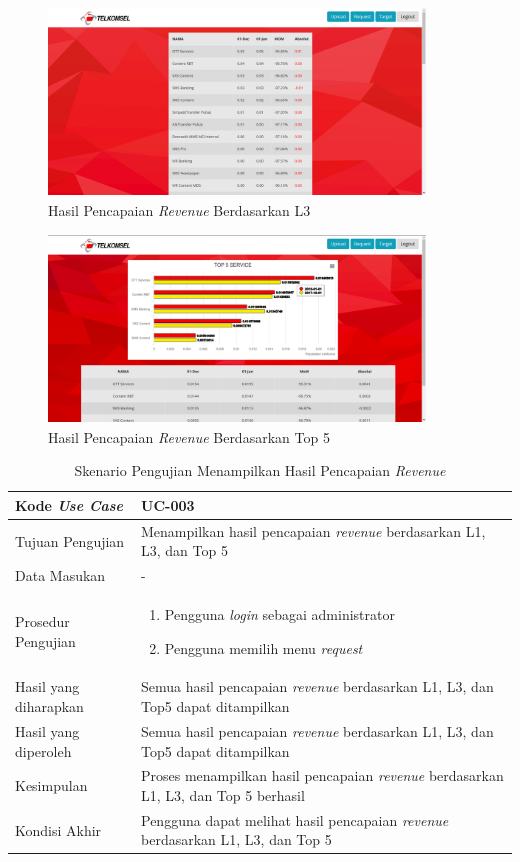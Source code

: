 \begin{figure}[h!]
	\centerline
	{\includegraphics[width=10cm,height=5cm]{bab6/halamanL3.png}}
	\caption{Hasil Pencapaian \textit{Revenue} Berdasarkan L3}
	\label{figure:requestL3}
\end{figure}

\begin{figure}[h!]
	\centerline
	{\includegraphics[width=10cm,height=5cm]{bab6/halamanT5.png}}
	\caption{Hasil Pencapaian \textit{Revenue} Berdasarkan Top 5}
	\label{figure:requestTop5}
\end{figure}

\begin{table}[h!]
	\centering
	\begin{tabular}{|p{4cm}|p{6cm}|}
		\hline
		Kode \textit{Use Case} & UC-003\\ \hline
		Tujuan Pengujian & Menampilkan hasil pencapaian \textit{revenue} berdasarkan L1, L3, dan Top 5\\ \hline
		Data Masukan & - \\ \hline
		Prosedur Pengujian & 
		\begin{enumerate}
			\item Pengguna \textit{login} sebagai administrator
			\item Pengguna memilih menu \textit{request}
		\end{enumerate}\\ \hline
		Hasil yang diharapkan & Semua hasil pencapaian \textit{revenue} berdasarkan L1, L3, dan Top5 dapat ditampilkan \\ \hline
		Hasil yang diperoleh & Semua hasil pencapaian \textit{revenue} berdasarkan L1, L3, dan Top5 dapat ditampilkan \\ \hline
		Kesimpulan & Proses menampilkan hasil pencapaian \textit{revenue} berdasarkan L1, L3, dan Top 5 berhasil\\ \hline
		Kondisi Akhir & Pengguna dapat melihat hasil pencapaian \textit{revenue} berdasarkan L1, L3, dan Top 5\\ \hline
	\end{tabular}\caption{Skenario Pengujian Menampilkan Hasil Pencapaian \textit{Revenue}}
	\label{tab:list_request}
\end{table}


